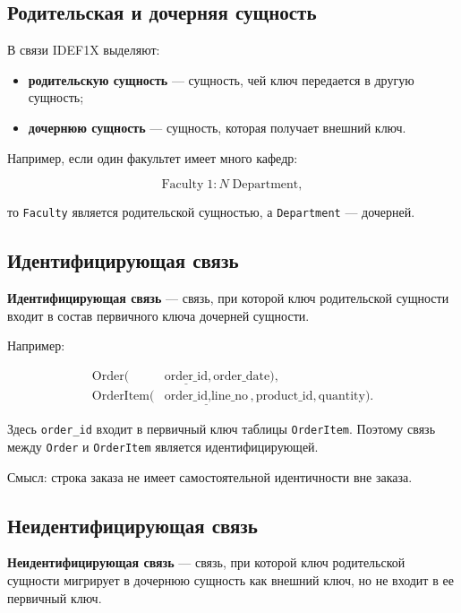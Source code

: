 \documentclass[12pt,a4paper]{article}
\theoremstyle{remark}
\begin{document}
\subsection{Родительская и дочерняя сущность}

В связи IDEF1X выделяют:

\begin{itemize}
    \item \textbf{родительскую сущность} --- сущность, чей ключ передается в другую сущность;
    \item \textbf{дочернюю сущность} --- сущность, которая получает внешний ключ.
\end{itemize}

Например, если один факультет имеет много кафедр:

\[
    \text{Faculty} \; 1 : N \; \text{Department},
\]

то \texttt{Faculty} является родительской сущностью, а \texttt{Department} --- дочерней.

\subsection{Идентифицирующая связь}

\textbf{Идентифицирующая связь} --- связь, при которой ключ родительской сущности входит в состав первичного ключа дочерней сущности.

Например:

\[
\begin{aligned}
    \text{Order}(&\underline{\text{order\_id}}, \text{order\_date}),\\
    \text{OrderItem}(&\underline{\text{order\_id}, \text{line\_no}}, \text{product\_id}, \text{quantity}).
\end{aligned}
\]

Здесь \texttt{order\_id} входит в первичный ключ таблицы \texttt{OrderItem}. Поэтому связь между \texttt{Order} и \texttt{OrderItem} является идентифицирующей.

Смысл: строка заказа не имеет самостоятельной идентичности вне заказа.

\subsection{Неидентифицирующая связь}

\textbf{Неидентифицирующая связь} --- связь, при которой ключ родительской сущности мигрирует в дочернюю сущность как внешний ключ, но не входит в ее первичный ключ.
\end{document}
